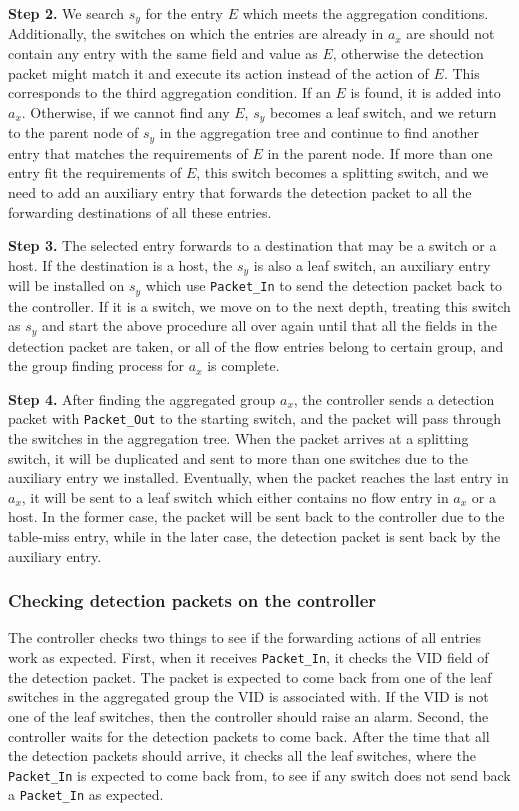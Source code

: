 \documentclass[conference]{IEEEtran}
\begin{document}
\textbf{Step 2.}
We search $s_y$ for the entry $E$ which meets the aggregation conditions. Additionally, the switches on which the entries are already in $a_x$ are should not contain any entry with the same field and value as $E$, otherwise the detection packet might match it and execute its action instead of the action of $E$. This corresponds to the third aggregation condition. If an $E$ is found, it is added into $a_x$. Otherwise, if we cannot find any $E$, $s_y$ becomes a leaf switch, and we return to the parent node of $s_y$ in the aggregation tree and continue to find another entry that matches the requirements of $E$ in the parent node. If more than one entry fit the requirements of $E$, this switch becomes a splitting switch, and we need to add an auxiliary entry that forwards the detection packet to all the forwarding destinations of all these entries.

\textbf{Step 3.}
The selected entry forwards to a destination that may be a switch or a host. If the destination is a host, the $s_y$ is also a leaf switch, an auxiliary entry will be installed on $s_y$ which use \texttt{Packet\_In} to send the detection packet back to the controller. If it is a switch, we move on to the next depth, treating this switch as $s_y$ and start the above procedure all over again until that all the fields in the detection packet are taken, or all of the flow entries belong to certain group, and the group finding process for $a_x$ is complete.

\textbf{Step 4.}
After finding the aggregated group $a_x$, the controller sends a detection packet with \texttt{Packet\_Out} to the starting switch, and the packet will pass through the switches in the aggregation tree. When the packet arrives at a splitting switch, it will be duplicated and sent to more than one switches due to the auxiliary entry we installed. Eventually, when the packet reaches the last entry in $a_x$, it will be sent to a leaf switch which either contains no flow entry in $a_x$ or a host. In the former case, the packet will be sent back to the controller due to the table-miss entry, while in the later case, the detection packet is sent back by the auxiliary entry.

\subsubsection{Checking detection packets on the controller}
The controller checks two things to see if the forwarding actions of all entries work as expected. First, when it receives \texttt{Packet\_In}, it checks the VID field of the detection packet. The packet is expected to come back from one of the leaf switches in the aggregated group the VID is associated with. If the VID is not one of the leaf switches, then the controller should raise an alarm. Second, the controller waits for the detection packets to come back. After the time that all the detection packets should arrive, it checks all the leaf switches, where the \texttt{Packet\_In} is expected to come back from, to see if any switch does not send back a \texttt{Packet\_In} as expected. 
\end{document}
